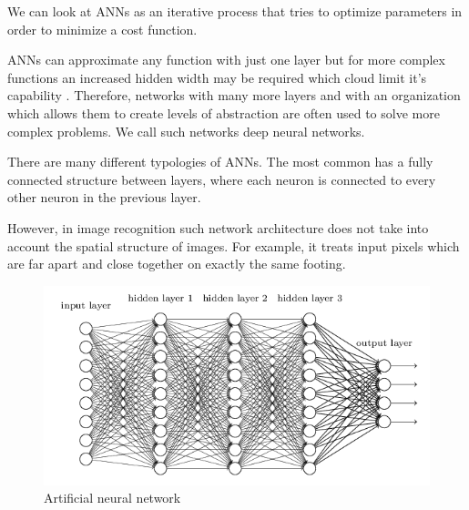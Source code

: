     We can look at \ac{ANN}s as an iterative process that tries to optimize parameters in order to minimize a cost function. \par
    \ac{ANN}s can approximate any function with just one layer but for more complex functions an increased hidden width may be required which cloud limit it's capability \cite{?}. Therefore, networks with many more layers and with an organization which allows them to create levels of abstraction are often used to solve more complex problems. We call such networks deep neural networks. \par
    There are many different typologies of \ac{ANN}s. The most common has a fully connected structure between layers, where each neuron is connected to every other neuron in the previous layer. 
    
    However, in image recognition such network architecture does not take into account the spatial structure of images. For example, it treats input pixels which are far apart and close together on exactly the same footing. \par
    \begin{figure}[ht]
      \centering
        \includegraphics[scale=0.5, width=\linewidth]{figs/Deep_Learning.png}
      \caption{Artificial neural network \cite{vggnet}}
      \label{fig:fcnn}
    \end{figure}
    
    
